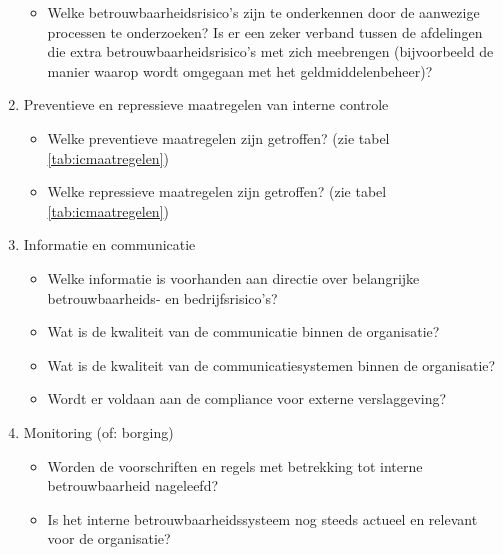 \begin{enumerate}
\begin{itemize}
            \item Welke betrouwbaarheidsrisico's zijn te onderkennen door de aanwezige processen te onderzoeken? Is er een zeker verband tussen de afdelingen die extra betrouwbaarheidsrisico's met zich meebrengen (bijvoorbeeld de manier waarop wordt omgegaan met het geldmiddelenbeheer)?
        \end{itemize}
    \item Preventieve en repressieve maatregelen van interne controle
        \begin{itemize}
            \item Welke preventieve maatregelen zijn getroffen? (zie tabel \ref{tab:icmaatregelen})
            \item Welke repressieve maatregelen zijn getroffen? (zie tabel \ref{tab:icmaatregelen})
        \end{itemize}
    \item Informatie en communicatie
        \begin{itemize}
            \item Welke informatie is voorhanden aan directie over belangrijke betrouwbaarheids- en bedrijfsrisico's?
            \item Wat is de kwaliteit van de communicatie binnen de organisatie?
            \item Wat is de kwaliteit van de communicatiesystemen binnen de organisatie?
            \item Wordt er voldaan aan de compliance voor externe verslaggeving? 
        \end{itemize}
    \item Monitoring (of: borging)
        \begin{itemize}
            \item Worden de voorschriften en regels met betrekking tot interne betrouwbaarheid nageleefd?
            \item Is het interne betrouwbaarheidssysteem nog steeds actueel en relevant voor de organisatie?
        \end{itemize}
\end{enumerate}


